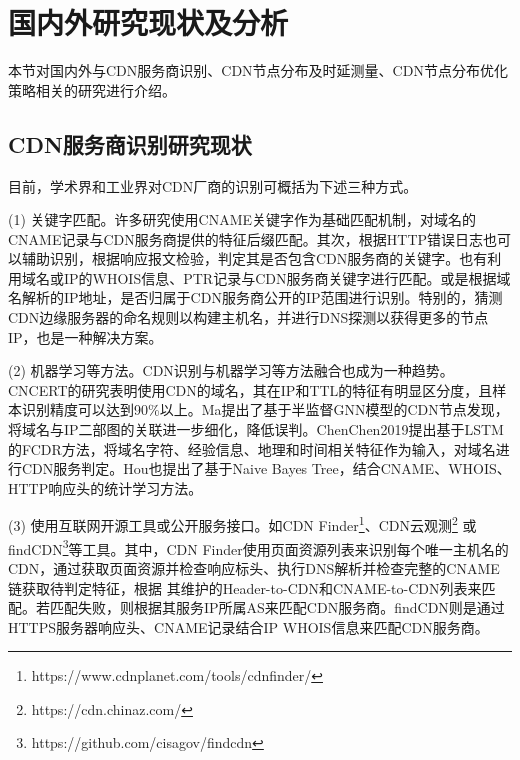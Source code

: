 
\section{国内外研究现状及分析}

本节对国内外与CDN服务商识别、CDN节点分布及时延测量、CDN节点分布优化策略相关的研究进行介绍。

\subsection{CDN服务商识别研究现状}
目前，学术界和工业界对CDN厂商的识别可概括为下述三种方式。
 
(1) 关键字匹配。许多研究\cite{Huang2008,Adhikari2014,Guo2018}使用CNAME关键字作为基础匹配机制，对域名的CNAME记录与CDN服务商提供的特征后缀匹配。其次，根据HTTP错误日志\cite{Huang2008,Guo2018}也可以辅助识别，根据响应报文检验，判定其是否包含CDN服务商的关键字。也有利用域名或IP的WHOIS\cite{Adhikari2014}信息、PTR\cite{Chen2019}记录与CDN服务商关键字进行匹配。或是根据域名解析的IP地址，是否归属于CDN服务商公开的IP范围进行识别\cite{Choffnes2017}。特别的，猜测CDN边缘服务器的命名规则以构建主机名，并进行DNS探测以获得更多的节点IP\cite{Hohlfeld2018,Timm2018}，也是一种解决方案。

(2) 机器学习等方法。CDN识别与机器学习等方法融合也成为一种趋势。CNCERT\cite{Li2020}的研究表明使用CDN的域名，其在IP和TTL的特征有明显区分度，且样本识别精度可以达到90\%以上。Ma\cite{Ma2021}提出了基于半监督GNN模型的CDN节点发现，将域名与IP二部图的关联进一步细化，降低误判。Chen{Chen2019}提出基于LSTM的FCDR方法，将域名字符、经验信息、地理和时间相关特征作为输入，对域名进行CDN服务判定。Hou\cite{Hou2021}也提出了基于Naive Bayes Tree\cite{Liang2006}，结合CNAME、WHOIS、HTTP响应头的统计学习方法\cite{Hou2021}。

(3) 使用互联网开源工具或公开服务接口。如CDN Finder\footnote{https://www.cdnplanet.com/tools/cdnfinder/}、CDN云观测\footnote{https://cdn.chinaz.com/}
或findCDN\footnote{https://github.com/cisagov/findcdn}等工具。其中，CDN Finder使用页面资源列表来识别每个唯一主机名的CDN，通过获取页面资源并检查响应标头、执行DNS解析并检查完整的CNAME链获取待判定特征，根据
其维护的Header-to-CDN和CNAME-to-CDN列表来匹配。若匹配失败，则根据其服务IP所属AS来匹配CDN服务商。findCDN则是通过HTTPS服务器响应头、CNAME记录结合IP WHOIS信息来匹配CDN服务商。 




